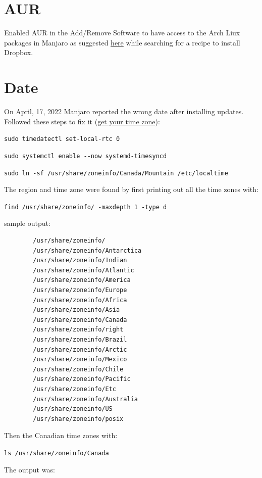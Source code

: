 \documentclass[]{scrartcl}
\begin{document}
	\section{AUR}
	
	Enabled AUR in the Add/Remove Software to have access to the Arch Liux packages in Manjaro as suggested \href{https://forum.manjaro.org/t/dropbox-install-new-to-manjaro/9576/5}{here} while searching for a recipe to install Dropbox.
	
	\section{Date}
	
	On April, 17, 2022 Manjaro reported the wrong date after installing updates.
	Followed these steps to fix it (\href{https://archived.forum.manjaro.org/t/howto-get-your-time-timezone-right-using-manjaro-windows-dual-boot/89359}{get your time zone}):
	\begin{compactenum}
		\item  \verb|sudo timedatectl set-local-rtc 0|
		\item \verb|sudo systemctl enable --now systemd-timesyncd|
		\item \verb|sudo ln -sf /usr/share/zoneinfo/Canada/Mountain /etc/localtime|
	\end{compactenum}
	
	The region and time zone were found by first printing out all the time zones with:
	
	\verb|find /usr/share/zoneinfo/ -maxdepth 1 -type d|
	
	sample output:
	
	\begin{verbatim}
		/usr/share/zoneinfo/
		/usr/share/zoneinfo/Antarctica
		/usr/share/zoneinfo/Indian
		/usr/share/zoneinfo/Atlantic
		/usr/share/zoneinfo/America
		/usr/share/zoneinfo/Europe
		/usr/share/zoneinfo/Africa
		/usr/share/zoneinfo/Asia
		/usr/share/zoneinfo/Canada
		/usr/share/zoneinfo/right
		/usr/share/zoneinfo/Brazil
		/usr/share/zoneinfo/Arctic
		/usr/share/zoneinfo/Mexico
		/usr/share/zoneinfo/Chile
		/usr/share/zoneinfo/Pacific
		/usr/share/zoneinfo/Etc
		/usr/share/zoneinfo/Australia
		/usr/share/zoneinfo/US
		/usr/share/zoneinfo/posix
	\end{verbatim}
	
	Then the Canadian time zones with:
	
	\verb|ls /usr/share/zoneinfo/Canada|
	
	The output was:
	
\end{document}
